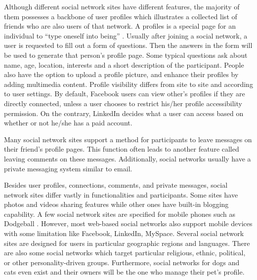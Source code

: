 Although different social network sites have different features, the majority of them possesses a backbone of user profiles which illustrates a collected list of friends who are also users of that network. A profiles is a special page for an individual to ``type oneself into being'' \cite{sunden2003material}. Usually after joining a social network, a user is requested to fill out a form of questions. Then the answers in the form will be used to generate that person's profile page. Some typical questions ask about name, age, location, interests and a short description of the participant. People also have the option to upload a profile picture, and enhance their profiles by adding multimedia content. Profile visibility differs from site to site and according to user settings. By default, Facebook users can view other's profiles if they are directly connected, unless a user chooses to restrict his/her profile accessibility permission. On the contrary, LinkedIn decides what a user can access based on whether or not he/she has a paid account.

Many social network sites support a method for participants to leave messages on their friend's profile pages. This function often leads to another feature called leaving comments on these messages. Additionally, social networks usually have a private messaging system similar to email.

Besides user profiles, connections, comments, and private messages, social network sites differ vastly in functionalities and participants. Some sites have photos and videos sharing features while other ones have built-in blogging capability. A few social network sites are specified for mobile phones such as Dodgeball \cite{humphreys2007mobile}. However, most web-based social networks also support mobile devices with some limitation like Facebook, LinkedIn, MySpace. Several social network sites are designed for users in particular geographic regions and languages. There are also some social networks which target particular religious, ethnic, political, or other personality-driven groups. Furthermore, social networks for dogs and cats even exist and their owners will be the one who manage their pet's profile.


